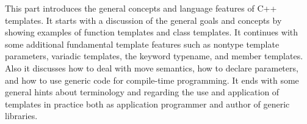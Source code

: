 This part introduces the general concepts and language features of C++ templates. It starts with a discussion of the general goals and concepts by showing examples of function templates and class templates. It continues with some additional fundamental template features such as nontype template parameters, variadic templates, the keyword typename, and member templates. Also it discusses how to deal with move semantics, how to declare parameters, and how to use generic code for compile-time programming. It ends with some general hints about terminology and regarding the use and application of templates in practice both as application programmer and author of generic libraries.